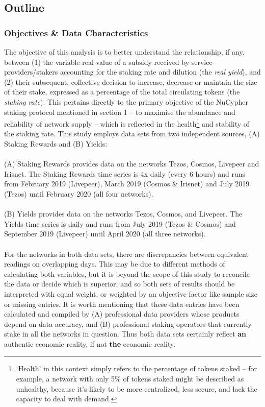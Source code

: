 \documentclass[longbibliography,nofootinbib]{revtex4-1}
\begin{document}
\subsection{Outline}

\subsubsection{Objectives \& Data Characteristics}

The objective of this analysis is to better understand the relationship, if any, between (1) the variable real value of a subsidy received by service-providers/stakers accounting for the staking rate and dilution (the \textit{real yield}), and (2) their subsequent, collective decision to increase, decrease or maintain the size of their stake, expressed as a percentage of the total circulating tokens (the \textit{staking rate}). This pertains directly to the primary objective of the NuCypher staking protocol mentioned in section 1 – to maximise the abundance and reliability of network supply – which is reflected in the health\footnote{`Health' in this context simply refers to the percentage of tokens staked – for example, a network with only 5\% of tokens staked might be described as unhealthy, because it's likely to be more centralized, less secure, and lack the capacity to deal with demand.} and stability of the staking rate. This study employs data sets from two independent sources, (A) Staking Rewards and (B) Yields:
\\\\
(A) Staking Rewards provides data on the networks Tezos, Cosmos, Livepeer and Irisnet. The Staking Rewards time series is 4x daily (every 6 hours) and runs from February 2019 (Livepeer), March 2019 (Cosmos \& Irisnet) and July 2019 (Tezos) until February 2020 (all four networks). 
\\\\
(B) Yields provides data on the networks Tezos, Cosmos, and Livepeer. The Yields time series is daily and runs from July 2019 (Tezos \& Cosmos) and September 2019 (Livepeer) until April 2020 (all three networks).
\\\\
For the networks in both data sets, there are discrepancies between equivalent readings on overlapping days. This may be due to different methods of calculating both variables, but it is beyond the scope of this study to reconcile the data or decide which is superior, and so both sets of results should be interpreted with equal weight, or weighted by an objective factor like sample size or missing entries. It is worth mentioning that these data entries have been calculated and compiled by (A) professional data providers whose products depend on data accuracy, and (B) professional staking operators that currently stake in all the networks in question. Thus both data sets certainly reflect \textbf{an} authentic economic reality, if not \textbf{the} economic reality. 
\end{document}
